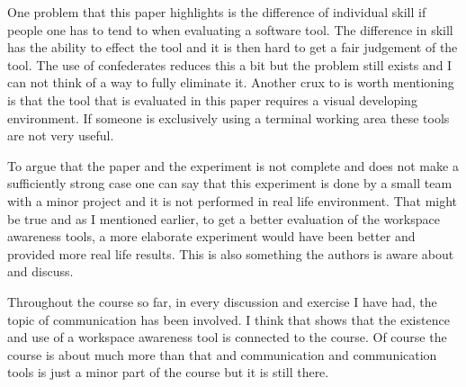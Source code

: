 \documentclass[a4paper]{article}
\begin{document}
One problem that this paper highlights is the difference of individual skill if people one has to tend to when evaluating a software tool. The difference in skill has the ability to effect the tool and it is then hard to get a fair judgement of the tool. The use of confederates reduces this a bit but the problem still exists and I can not think of a way to fully eliminate it. Another crux to is worth mentioning is that the tool that is evaluated in this paper requires a visual developing environment. If someone is exclusively using a terminal working area these tools are not very useful.

To argue that the paper and the experiment is not complete and does not make a sufficiently strong case one can say that this experiment is done by a small team with a minor project and it is not performed in real life environment. That might be true and as I mentioned earlier, to get a better evaluation of the workspace awareness tools, a more elaborate experiment would have been better and provided more real life results. This is also something the authors is aware about and discuss.

Throughout the course so far, in every discussion and exercise I have had, the topic of communication has been involved. I think that shows that the existence and use of a workspace awareness tool is connected to the course. Of course the course is about much more than that and communication and communication tools is just a minor part of the course but it is still there. 
\end{document}
